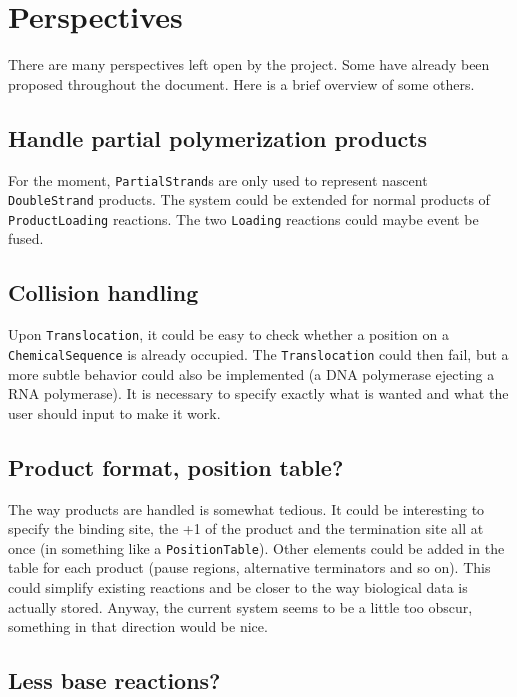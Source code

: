 
\section{Perspectives}

There are many perspectives left open by the project. Some have already been proposed throughout the document. Here is a brief overview of some others.

\subsection{Handle partial polymerization products}

For the moment, \texttt{PartialStrand}s are only used to represent nascent \texttt{DoubleStrand} products. The system could be extended for normal products of \texttt{ProductLoading} reactions. The two \texttt{Loading} reactions could maybe event be fused.

\subsection{Collision handling}

Upon \texttt{Translocation}, it could be easy to check whether a position on a \texttt{ChemicalSequence} is already occupied. The \texttt{Translocation} could then fail, but a more subtle behavior could also be implemented (a DNA polymerase ejecting a RNA polymerase). It is necessary to specify exactly what is wanted and what the user should input to make it work.

\subsection{Product format, position table?}

The way products are handled is somewhat tedious. It could be interesting to specify the binding site, the +1 of the product and the termination site all at once (in something like a \texttt{PositionTable}). Other elements could be added in the table for each product (pause regions, alternative terminators and so on). This could simplify existing reactions and be closer to the way biological data is actually stored. Anyway, the current system seems to be a little too obscur, something in that direction would be nice.

\subsection{Less base reactions?}

